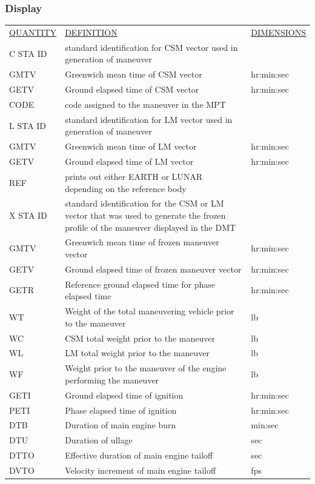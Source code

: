 \documentclass[11pt]{article} %
\begin{document}
\subsubsection{Display}
\begin{center}
\begin{tabular}{ L{2.4cm} L{7.1cm} L{3cm} }
\underline{QUANTITY} & \underline{DEFINITION} & \underline{DIMENSIONS} \\
C STA ID&standard identification for CSM vector used in generation of maneuver&\\
GMTV&Greenwich mean time of CSM vector&hr:min:sec\\
GETV&Ground elapsed time of CSM vector&hr:min:sec\\
CODE&code assigned to the maneuver in the MPT&\\
L STA ID&standard identification for LM vector used in generation of maneuver&\\
GMTV&Greenwich mean time of LM vector&hr:min:sec\\
GETV&Ground elapsed time of LM vector&hr:min:sec\\
REF&prints out either EARTH or LUNAR depending on the reference body&\\
X STA ID&standard identification for the CSM or LM vector that was used to generate the frozen profile of the maneuver displayed in the DMT&\\
GMTV&Greenwich mean time of frozen maneuver vector&hr:min:sec\\
GETV&Ground elapsed time of frozen maneuver vector&hr:min:sec\\
GETR&Reference ground elapsed time for phase elapsed time &hr:min:sec\\
WT&Weight of the total maneuvering vehicle prior to the maneuver&lb\\
WC&CSM total weight prior to the maneuver&lb\\
WL&LM total weight prior to the maneuver&lb\\
WF&Weight prior to the maneuver of the engine performing the maneuver&lb\\
GETI&Ground elapsed time of ignition&hr:min:sec\\
PETI&Phase elapsed time of ignition&hr:min:sec\\
DTB&Duration of main engine burn&min:sec\\
DTU&Duration of ullage&sec\\
DTTO&Effective duration of main engine tailoff&sec\\
DVTO&Velocity increment of main engine tailoff&fps\\

\end{tabular}
\end{center}
\end{document}
